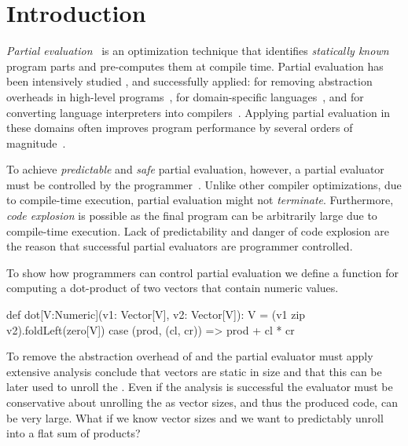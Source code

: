 \section{Introduction}
\label{sct:introduction}

\emph{Partial evaluation}~\cite{jones1993partial} is an optimization technique
that identifies \emph{statically known} program parts and pre-computes them at
compile time. Partial evaluation has been intensively studied \cite{}, and
successfully applied:  for removing abstraction overheads in high-level
programs~\cite{carette2005multi,rompf2012lightweight}, for domain-specific
languages~\cite{brady2010,jonnalagedda2014staged}, and for converting language
interpreters into compilers~\cite{futamura1999partial,lancet,wurthinger2013one}.
Applying partial evaluation in these domains often improves program performance
by several orders of magnitude~\cite{shali2011Hybrid,brady2010}.


To achieve \emph{predictable} and \emph{safe} partial evaluation, however, a
partial evaluator must be controlled by the
programmer~\cite{brady2010,le2004specialization}. Unlike other compiler
optimizations, due to compile-time execution, partial evaluation might not
\emph{terminate}. Furthermore, \emph{code explosion} is possible as the final
program can be arbitrarily large due to compile-time execution. Lack of
predictability and danger of code explosion are the reason that successful
partial evaluators \cite{brady2010,taha_multi-stage_1997,rompf2012lightweight,wurthinger2013one}
are programmer controlled.

To show how programmers can control partial evaluation we define a function
  for computing a dot-product of two vectors that contain numeric
values.
\vspace{1.8mm}
\begin{listing}
  def dot[V:Numeric](v1: Vector[V], v2: Vector[V]): V =
    (v1 zip v2).foldLeft(zero[V]){ case (prod, (cl, cr)) =>
      prod + cl * cr
    }
\end{listing}
\vspace{1.8mm}

To remove the abstraction overhead of  and  the partial evaluator
must apply extensive analysis conclude that vectors are static in size and
that this can be later used to unroll the . Even if the analysis
is successful the evaluator must be conservative about unrolling the 
as vector sizes, and thus the produced code, can be very large. What if we know
vector sizes and we want to predictably unroll  into a flat sum of
products?


